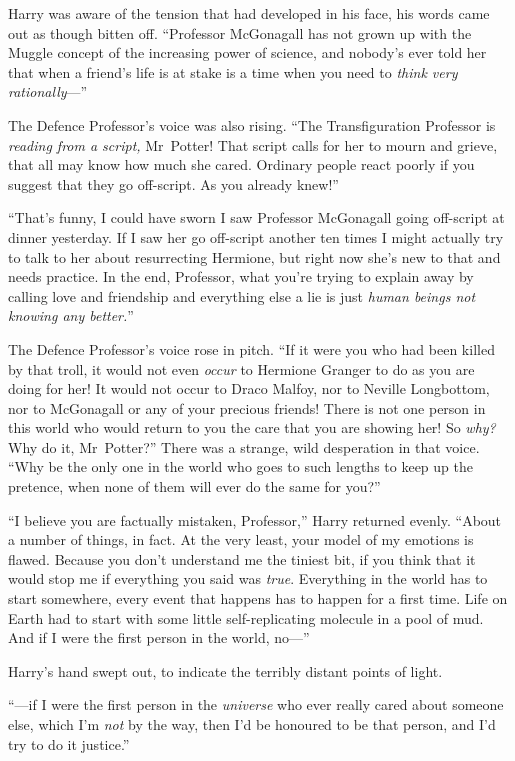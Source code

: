 Harry was aware of the tension that had developed in his face, his words came out as though bitten off. “Professor McGonagall has not grown up with the Muggle concept of the increasing power of science, and nobody’s ever told her that when a friend’s life is at stake is a time when you need to \emph{think very rationally}—”

The Defence Professor’s voice was also rising. “The Transfiguration Professor is \emph{reading from a script,} Mr~Potter! That script calls for her to mourn and grieve, that all may know how much she cared. Ordinary people react poorly if you suggest that they go off-script. As you already knew!”

“That’s funny, I could have sworn I saw Professor McGonagall going off-script at dinner yesterday. If I saw her go off-script another ten times I might actually try to talk to her about resurrecting Hermione, but right now she’s new to that and needs practice. In the end, Professor, what you’re trying to explain away by calling love and friendship and everything else a lie is just \emph{human beings not knowing any better.}”

The Defence Professor’s voice rose in pitch. “If it were you who had been killed by that troll, it would not even \emph{occur} to Hermione Granger to do as you are doing for her! It would not occur to Draco Malfoy, nor to Neville Longbottom, nor to McGonagall or any of your precious friends! There is not one person in this world who would return to you the care that you are showing her! So \emph{why?} Why do it, Mr~Potter?” There was a strange, wild desperation in that voice. “Why be the only one in the world who goes to such lengths to keep up the pretence, when none of them will ever do the same for you?”

“I believe you are factually mistaken, Professor,” Harry returned evenly. “About a number of things, in fact. At the very least, your model of my emotions is flawed. Because you don’t understand me the tiniest bit, if you think that it would stop me if everything you said was \emph{true}. Everything in the world has to start somewhere, every event that happens has to happen for a first time. Life on Earth had to start with some little self-replicating molecule in a pool of mud. And if I were the first person in the world, no—”

Harry’s hand swept out, to indicate the terribly distant points of light.

“—if I were the first person in the \emph{universe} who ever really cared about someone else, which I’m \emph{not} by the way, then I’d be honoured to be that person, and I’d try to do it justice.”

